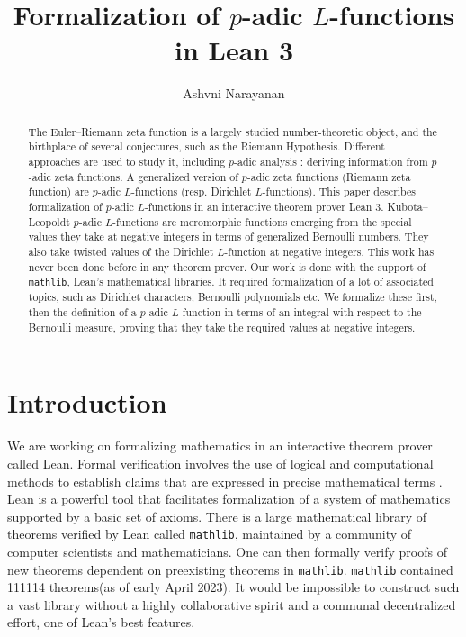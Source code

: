 \documentclass[a4paper,UKenglish,cleveref, autoref, thm-restate]{lipics-v2021}
\title{Formalization of $p$-adic $L$-functions in Lean 3} %
\author{Ashvni Narayanan}{London School of Geometry and Number Theory, Imperial College London}{a.narayanan20@imperial.ac.uk}{https://orcid.org/0000-0003-2777-4228}{EPSRC Grant EP/S021590/1 (UK)}%
\newcommand{\lean}[1]{\texttt{#1}\xspace} %
\begin{document}
\maketitle

\begin{abstract}
The Euler--Riemann zeta function is a largely studied number-theoretic object, and the birthplace of several conjectures, 
such as the Riemann Hypothesis. Different approaches are used to study it, including $p$-adic analysis : 
deriving information from $p$-adic zeta functions. A generalized version of $p$-adic zeta functions (Riemann zeta function) 
are $p$-adic $L$-functions (resp. Dirichlet $L$-functions). This paper describes formalization of $p$-adic $L$-functions 
in an interactive theorem prover Lean 3. Kubota--Leopoldt $p$-adic $L$-functions are meromorphic functions emerging from the 
special values they take at negative integers in terms of generalized Bernoulli numbers. They also take twisted values of 
the Dirichlet $L$-function at negative integers. This work has never been done before in any theorem prover. 
Our work is done with the support of \lean{mathlib}, Lean's mathematical libraries. It required formalization of a 
lot of associated topics, such as Dirichlet characters, Bernoulli polynomials etc. We formalize these first, 
then the definition of a $p$-adic $L$-function in terms of an integral with respect to the Bernoulli measure, 
proving that they take the required values at negative integers.
\end{abstract}

\section{Introduction}
We are working on formalizing mathematics in an interactive theorem prover called Lean. 
Formal verification involves the use of logical and computational methods to establish 
claims that are expressed in precise mathematical terms \cite{TPIL}. Lean is a powerful tool 
that facilitates formalization of a system of mathematics supported by a basic set of axioms. There is a large mathematical library of theorems verified by Lean called \lean{mathlib}, maintained by a community of computer scientists and mathematicians. One can then 
formally verify proofs of new theorems dependent on preexisting theorems in \lean{mathlib}. 
\lean{mathlib} contained 111114 theorems(as of early April 2023). It would be impossible to construct 
such a vast library without a highly collaborative spirit and a communal decentralized effort, one of 
Lean's best features. 
\end{document}
